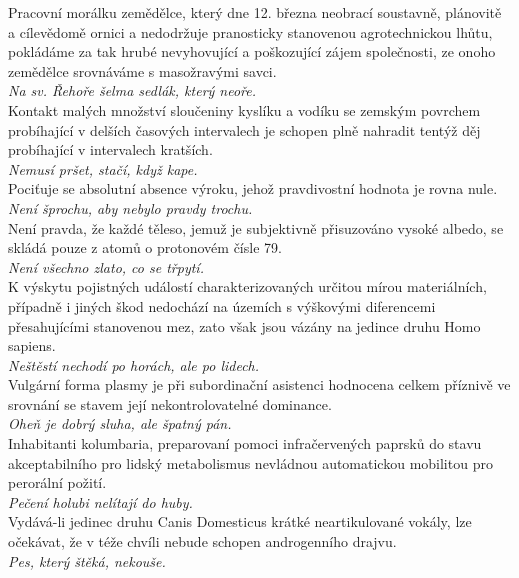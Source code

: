 \begin{multicols}{\value{columnsgames}}
\noindent
Pracovní morálku zemědělce, který dne 12. března neobrací
soustavně, plánovitě a cílevědomě ornici a nedodržuje pranosticky
stanovenou agrotechnickou lhůtu, pokládáme za tak hrubé nevyhovující
a poškozující zájem společnosti, ze onoho zemědělce srovnáváme
s masožravými savci.\\[1 mm]
{\sl Na sv. Řehoře šelma sedlák, který neoře.}\\

\noindent
Kontakt malých množství sloučeniny kyslíku a vodíku se zemským
povrchem probíhající v delších časových intervalech je schopen
plně nahradit tentýž děj probíhající v intervalech kratších.\\[1 mm]
{\sl Nemusí pršet, stačí, když kape.}\\

\noindent
Pociťuje se absolutní absence výroku, jehož pravdivostní
hodnota je rovna nule.\\[1 mm]
{\sl Není šprochu, aby nebylo pravdy trochu.}\\

\noindent
Není pravda, že každé těleso, jemuž je subjektivně přisuzováno
vysoké albedo, se skládá pouze z atomů o protonovém čísle 79.\\[1 mm]
{\sl Není všechno zlato, co se třpytí.}\\

\noindent
K výskytu pojistných událostí charakterizovaných určitou
mírou materiálních, případně i jiných škod nedochází na územích
s výškovými diferencemi přesahujícími stanovenou mez, zato však
jsou vázány na jedince druhu Homo sapiens.\\[1 mm]
{\sl Neštěstí nechodí po horách, ale po lidech.}\\

\noindent
Vulgární forma plasmy je při subordinační asistenci hodnocena
celkem příznivě ve srovnání se stavem její nekontrolovatelné
dominance.\\[1 mm]
{\sl Oheň je dobrý sluha, ale špatný pán.}\\

\noindent
Inhabitanti kolumbaria, preparovaní pomoci infračervených
paprsků do stavu akceptabilního pro lidský metabolismus nevládnou
automatickou mobilitou pro perorální požití.\\[1 mm]
{\sl Pečení holubi nelítají do huby.}\\

\noindent
Vydává-li jedinec druhu Canis Domesticus krátké neartikulované
vokály, lze očekávat, že v téže chvíli nebude schopen androgenního
drajvu.\\[1 mm]
{\sl Pes, který štěká, nekouše.}\\


\end{multicols}
